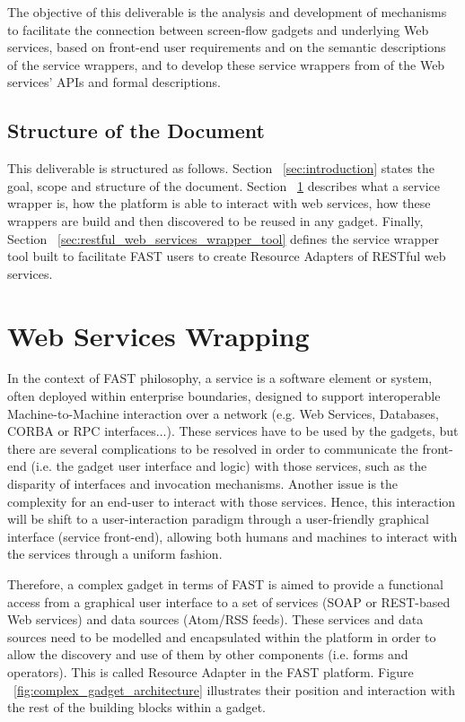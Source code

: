 \documentclass{article}
\begin{document}
The objective of this deliverable is the analysis and development of mechanisms to facilitate the connection between screen-flow gadgets and underlying Web services, based on front-end user requirements and on the semantic descriptions of the service wrappers, and to develop these service wrappers from of the Web services' APIs and formal descriptions.


\subsection{Structure of the Document} %
\label{sub:structure_of_the_document}

This deliverable is structured as follows. Section ~\ref{sec:introduction} states the goal, scope and structure of the document. Section ~\ref{sec:web_services_wrapping} describes what a service wrapper is, how the platform is able to interact with web services, how these wrappers are build and then discovered to be reused in any gadget. Finally, Section ~\ref{sec:restful_web_services_wrapper_tool} defines the service wrapper tool built to facilitate FAST users to create Resource Adapters of RESTful web services.


\clearpage
\section{Web Services Wrapping} %
\label{sec:web_services_wrapping}

In the context of FAST philosophy, a service is a software element or system, often deployed within enterprise boundaries, designed to support interoperable Machine-to-Machine interaction over a network (e.g. Web Services, Databases, CORBA or RPC interfaces...). These services have to be used by the gadgets, but there are several complications to be resolved in order to communicate the front-end (i.e. the gadget user interface and logic) with those services, such as the disparity of interfaces and invocation mechanisms. Another issue is the complexity for an end-user to interact with those services. Hence, this interaction will be shift to a user-interaction paradigm through a user-friendly graphical interface (service front-end), allowing both humans and machines to interact with the services through a uniform fashion.

Therefore, a complex gadget in terms of FAST is aimed to provide a functional access from a graphical user interface to a set of services (SOAP or REST-based Web services) and data sources (Atom/RSS feeds). These services and data sources need to be modelled and encapsulated within the platform in order to allow the discovery and use of them by other components (i.e. forms and operators). This is called Resource Adapter in the FAST platform. Figure ~\ref{fig:complex_gadget_architecture} illustrates their position and interaction with the rest of the building blocks within a gadget.
\end{document}
